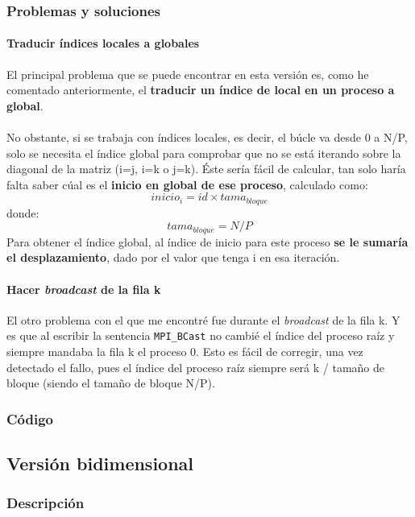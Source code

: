 \subsubsection{Problemas y soluciones}

\paragraph{Traducir índices locales a globales}

El principal problema que se puede encontrar en esta versión es, como he comentado anteriormente, el \textbf{traducir un índice de local en un proceso a global}.
\\ \\
No obstante, si se trabaja con índices locales, es decir, el búcle va desde 0 a N/P, solo se necesita el índice global para comprobar que no se está iterando sobre la diagonal de la matriz (i=j, i=k o j=k). Éste sería fácil de calcular, tan solo haría falta saber cúal es el \textbf{inicio en global de ese proceso}, calculado como:
\[ inicio_i = id \times tama_{bloque}  \]
donde:
\[ tama_{bloque} = N / P  \]
Para obtener el índice global, al índice de inicio para este proceso \textbf{se le sumaría el desplazamiento}, dado por el valor que tenga i en esa iteración.

\paragraph{Hacer \textit{broadcast} de la fila k}

El otro problema con el que me encontré fue durante el \textit{broadcast} de la fila k. Y es que al escribir la sentencia \texttt{MPI\_BCast} no cambié el índice del proceso raíz y siempre mandaba la fila k el proceso 0. Esto es fácil de corregir, una vez detectado el fallo, pues el índice del proceso raíz siempre será k / tamaño de bloque (siendo el tamaño de bloque N/P).

\subsubsection{Código}



\subsection{Versión bidimensional}

\subsubsection{Descripción}

